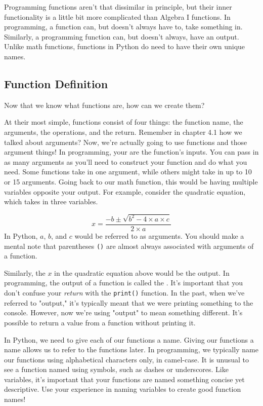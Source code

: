 Programming functions aren't that dissimilar in principle, but their inner functionality is a little bit more complicated than Algebra I functions. In programming, a function can, but doesn't always have to, take something in. Similarly, a programming function can, but doesn't always, have an output. Unlike math functions, functions in Python do need to have their own unique names.\par
\subsection{Function Definition}
Now that we know what functions are, how can we create them?\par
At their most simple, functions consist of four things: the function name, the arguments, the operations, and the return. Remember in chapter 4.1 how we talked about arguments? Now, we're actually going to use functions and those argument things! In programming, your  are the function's inputs. You can pass in as many arguments as you'll need to construct your function and do what you need. Some functions take in one argument, while others might take in up to 10 or 15 arguments. Going back to our math function, this would be having multiple variables opposite your output. For example, consider the quadratic equation, which takes in three variables.\par
$$
x = \frac{-b \pm \sqrt{b^{2} - 4 \times a \times c}}{2 \times a}
$$
In Python, $a$, $b$, and $c$ would be referred to as arguments. You should make a mental note that parentheses \verb|()| are almost always associated with arguments of a function.\par
Similarly, the $x$ in the quadratic equation above would be the output. In programming, the output of a function is called the . It's important that you don't confuse your \textit{return} with the \verb|print()| function. In the past, when we've referred to "output," it's typically meant that we were printing something to the console. However, now we're using "output" to mean something different. It's possible to return a value from a function without printing it.\par
In Python, we need to give each of our functions a name. Giving our functions a name allows us to refer to the functions later. In programming, we typically name our functions using alphabetical characters only, in camel-case. It is unusual to see a function named using symbols, such as dashes or underscores. Like variables, it's important that your functions are named something concise yet descriptive. Use your experience in naming variables to create good function names!\par
